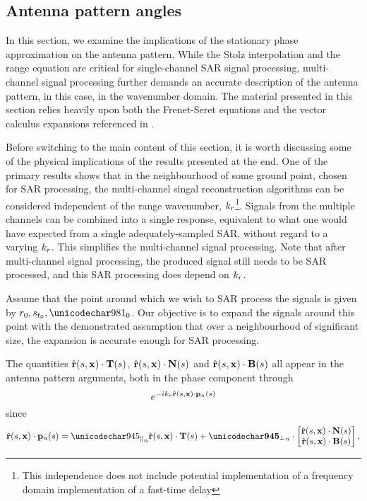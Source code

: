 \subsection{Antenna pattern angles}
\label{sc:antennaAngles}
In this section, we examine the implications of the stationary phase approximation on the antenna pattern. While the Stolz interpolation and the range equation are critical for single-channel SAR signal processing, multi-channel signal processing further demands an accurate description of the antenna pattern, in this case, in the wavenumber domain. The material presented in this section relies heavily upon both the Frenet-Seret equations and the vector calculus expansions referenced in .
\par
Before switching to the main content of this section, it is worth discussing some of the physical implications of the results presented at the end. One of the primary results shows that in the neighbourhood of some ground point, chosen for SAR processing, the multi-channel singal reconstruction algorithms can be considered independent of the range wavenumber, $k_r$\footnote{This independence does not include potential implementation of a frequency domain implementation of a fast-time delay}. Signals from the multiple channels can be combined into a single response, equivalent to what one would have expected from a single adequately-sampled SAR, without regard to a varying $k_r$. This simplifies the multi-channel signal processing. Note that after multi-channel signal processing, the produced signal still needs to be SAR processed, and this SAR processing does depend on $k_r$. 
\par
Assume that the point around which we wish to SAR process the signals is given by $\targetrangez, \targetxparmz, \targetdepressionz$. Our objective is to expand the signals around this point with the demonstrated assumption that over a neighbourhood of significant size, the expansion is accurate enough for SAR processing.
\par
The quantities $\hat{\mathbf{r}}(s, \mathbf{\mathbf{x}})\cdot\mathbf{T}(s)$, $\hat{\mathbf{r}}(s, \mathbf{\mathbf{x}})\cdot\mathbf{N}(s)$ and $\hat{\mathbf{r}}(s, \mathbf{\mathbf{x}})\cdot\mathbf{B}(s)$ all appear in the antenna pattern arguments, both in the phase component through
\begin{equation}
 e^{-ik_r\hat{\mathbf{r}}(s, \mathbf{\mathbf{x}})\cdot\mathbf{p}_{n}(s)}
\end{equation}
since
\begin{equation}
 \uRangeVectorParm\cdot\pAntennaParm{\channelIndex} = \alongtrack\uRangeVectorParm\cdot\vct{T}(\parm) + \acrosstrack\cdot\begin{bmatrix}\uRangeVectorParm\cdot\vct{N}(\parm)\\\uRangeVectorParm\cdot\vct{B}(\parm)\end{bmatrix},
\end{equation}
